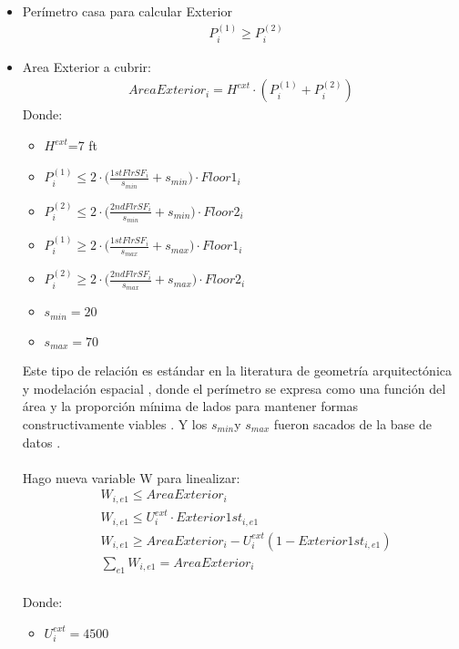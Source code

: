 \begin{itemize}
    \item {Perímetro casa para calcular Exterior}
\begin{align}
    &P_{i}^{(1)}\geq P_{i}^{(2)}
\end{align}
    \item Area Exterior a cubrir:\\
\begin{align}
    AreaExterior_{i}=H^{ext}\cdot (P_{i}^{(1)}+P_{i}^{(2)})
\end{align}
Donde:
    \begin{itemize}
        \item $H^{ext}$=7 ft
        \item $P_{i}^{(1)}\leq 2\cdot \Big ( \frac{1stFlrSF_{i}}{s_{min}}+s_{min}\Big)\cdot Floor1_{i}$
        \item $P_{i}^{(2)}\leq 2\cdot \Big ( \frac{2ndFlrSF_{i}}{s_{min}}+s_{min}\Big)\cdot Floor2_{i}$
        \item $P_{i}^{(1)}\geq 2\cdot \Big ( \frac{1stFlrSF_{i}}{s_{max}}+s_{max}\Big)\cdot Floor1_{i}$
        \item $P_{i}^{(2)}\geq2\cdot \Big ( \frac{2ndFlrSF_{i}}{s_{max}}+s_{max}\Big)\cdot Floor2_{i}$
        \item $s_{min}=20$
        \item $s_{max}=70$
    \end{itemize}
Este tipo de relación es estándar en la literatura de geometría arquitectónica y modelación espacial \cite{Durst2024}, donde el perímetro se expresa como una función del área y la proporción mínima de lados para mantener formas constructivamente viables \cite{Smith2017}. Y los $s_{min}$y $s_{max}$ fueron sacados de la base de datos \cite{decock2011}.\\
\\
Hago nueva variable W para linealizar:\\
\begin{align}
    &W_{i,e1}\leq AreaExterior_{i}\\
    &W_{i,e1}\leq U_{i}^{ext}\cdot Exterior1st_{i,e1}\\
    &W_{i,e1}\geq AreaExterior_{i}-U_{i}^{ext}(1-Exterior1st_{i,e1})\\
    &\sum_{e1}W_{i,e1}=AreaExterior_{i}
\end{align}\\
Donde:\\
    \begin{itemize}
        \item $U_{i}^{ext}=4500$
    \end{itemize}





\end{itemize}
